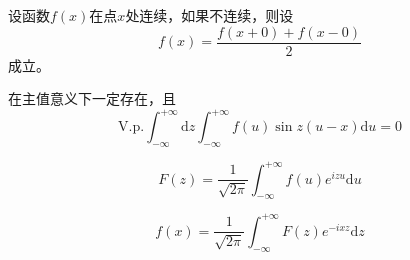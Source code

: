 \documentclass[12pt,a4paper]{article}
\newcommand{\dif}{\mathrm{d}}
\begin{document}
设函数$f(x)$在点$x$处连续，如果不连续，则设
\begin{equation}
f(x) = \frac{f(x+0) +f(x-0)}{2}
\end{equation}
成立。

在主值意义下一定存在，且
\begin{equation}
\text{V.p.} \int_{-\infty}^{+\infty} \dif z \int_{-\infty}^{+\infty} f(u) \sin z(u-x) \dif u = 0
\end{equation}

\begin{equation}
F(z) = \frac{1}{\sqrt{2\pi} } \int_{-\infty}^{+\infty} f(u) e^{izu} \dif u
\end{equation}

\begin{equation}
f(x) = \frac{1}{\sqrt{2\pi} } \int_{-\infty}^{+\infty} F(z) e^{-ixz} \dif z 
\end{equation}
\end{document}
